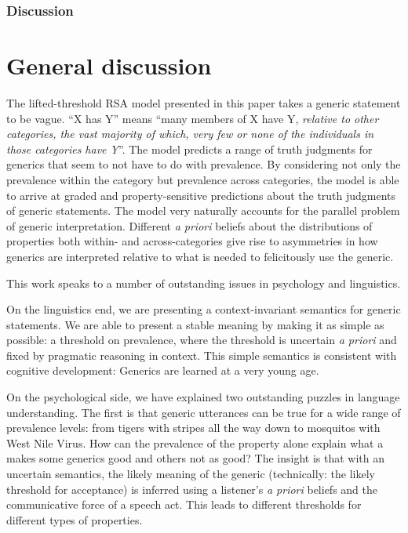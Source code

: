 \documentclass[10pt,letterpaper]{article}
\begin{document}
\subsubsection{Discussion}



\section{General discussion}

The lifted-threshold RSA model presented in this paper takes a generic statement to be vague. ``X has Y'' means ``many members of X have Y, \emph{relative to other categories, the vast majority of which, very few or none of the individuals in those categories have Y}''. 
The model predicts a range of truth judgments for generics that seem to not have to do with prevalence. 
By considering not only the prevalence within the category but prevalence across categories, the model is able to arrive at graded and property-sensitive predictions about the truth judgments of generic statements. 
The model very naturally accounts for the parallel problem of generic interpretation. 
Different \emph{a priori} beliefs about the distributions of properties both within- and across-categories give rise to asymmetries in how generics are interpreted relative to what is needed to felicitously use the generic. 

This work speaks to a number of outstanding issues in psychology and linguistics. 

On the linguistics end, we are presenting a context-invariant semantics for generic statements. 
We are able to present a stable meaning by making it as simple as possible: a threshold on prevalence, where the threshold is uncertain \emph{a priori} and fixed by pragmatic reasoning in context.
This simple semantics is consistent with cognitive development: Generics are learned at a very young age.

On the psychological side, we have explained two outstanding puzzles in language understanding. 
The first is that generic utterances can be true for a wide range of prevalence levels: from tigers with stripes all the way down to mosquitos with West Nile Virus. 
How can the prevalence of the property alone explain what a makes some generics good and others not as good? 
The insight is that with an uncertain semantics, the likely meaning of the generic (technically: the likely threshold for acceptance) is inferred using a listener's \emph{a priori} beliefs and the communicative force of a speech act. 
This leads to different thresholds for different types of properties. 
\end{document}
